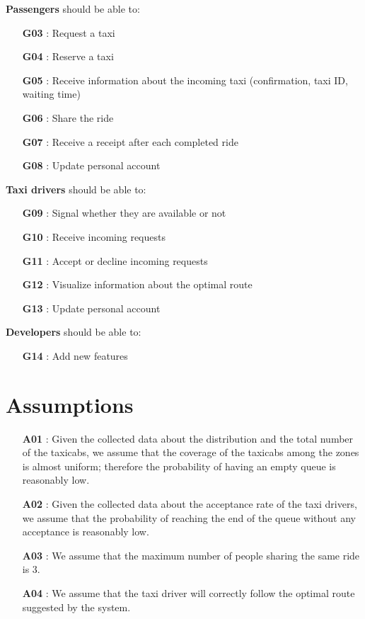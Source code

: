 \noindent \textbf{Passengers} should be able to:
\begin{itemize}
	\item [\textbf{G03}] : Request a taxi
	\item [\textbf{G04}] : Reserve a taxi
	\item [\textbf{G05}] : Receive information about the incoming taxi (confirmation, taxi ID, waiting time)
	\item [\textbf{G06}] : Share the ride
	\item [\textbf{G07}] : Receive a receipt after each completed ride
	\item [\textbf{G08}] : Update personal account \\
\end{itemize}

\noindent \textbf{Taxi drivers} should be able to:
\begin{itemize}
	\item [\textbf{G09}] : Signal whether they are available or not
	\item [\textbf{G10}] : Receive incoming requests
	\item [\textbf{G11}] : Accept or decline incoming requests
	\item [\textbf{G12}] : Visualize information about the optimal route
	\item [\textbf{G13}] : Update personal account \\
\end{itemize}

\noindent \textbf{Developers} should be able to:
\begin{itemize}
	\item [\textbf{G14}] : Add new features
\end{itemize}

\section{Assumptions} \label{assump}
\begin{itemize}
	\item [\textbf{A01}]: Given the collected data about the distribution and the total number of the taxicabs, we assume that the coverage of the taxicabs among the zones is almost uniform; therefore the probability of having an empty queue is reasonably low.
	\item [\textbf{A02}]: Given the collected data about the acceptance rate of the taxi drivers, we assume that the probability of reaching the end of the queue without any acceptance is reasonably low.
	\item [\textbf{A03}]: We assume that the maximum number of people sharing the same ride is 3.
	\item [\textbf{A04}]: We assume that the taxi driver will correctly follow the optimal route suggested by the system.
\end{itemize}

